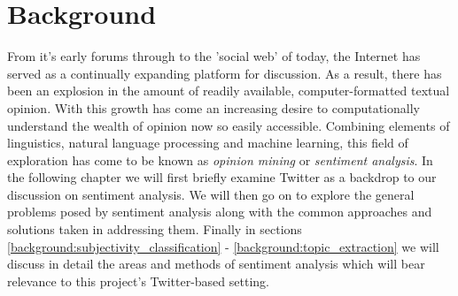 

\chapter{Background}
\label{background}

From it's early forums through to the 'social web' of today, the Internet has served as a continually expanding platform for discussion. As a result, there has been an explosion in the amount of readily available, computer-formatted textual opinion. With this growth has come an increasing desire to computationally understand the wealth of opinion now so easily accessible. Combining elements of linguistics, natural language processing and machine learning, this field of exploration has come to be known as \emph{opinion mining} or \emph{sentiment analysis}. In the following chapter we will first briefly examine Twitter as a backdrop to our discussion on sentiment analysis. We will then go on to explore the general problems posed by sentiment analysis along with the common approaches and solutions taken in addressing them. Finally in sections \ref{background:subjectivity_classification} - \ref{background:topic_extraction} we will discuss in detail the areas and methods of sentiment analysis which will bear relevance to this project's Twitter-based setting.


